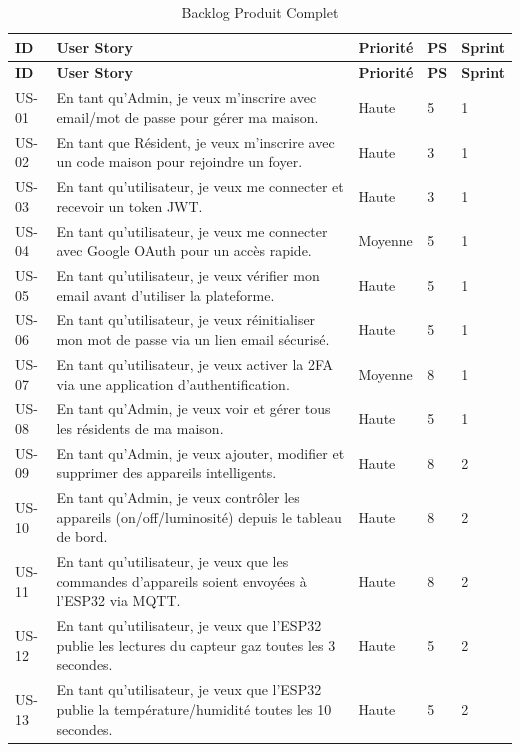 \begin{center}
\begin{longtable}{p{} p{} p{} p{} p{}}
\caption{Backlog Produit Complet}\label{tab:backlog}\\
\toprule
\textbf{ID} & \textbf{User Story} & \textbf{Priorité} & \textbf{PS} & \textbf{Sprint} \\
\midrule
\endfirsthead
\toprule
\textbf{ID} & \textbf{User Story} & \textbf{Priorité} & \textbf{PS} & \textbf{Sprint} \\
\midrule
\endhead
\bottomrule
\endfoot
US-01 & En tant qu'Admin, je veux m'inscrire avec email/mot de passe pour gérer ma maison. & Haute & 5 & 1 \\
US-02 & En tant que Résident, je veux m'inscrire avec un code maison pour rejoindre un foyer. & Haute & 3 & 1 \\
US-03 & En tant qu'utilisateur, je veux me connecter et recevoir un token JWT. & Haute & 3 & 1 \\
US-04 & En tant qu'utilisateur, je veux me connecter avec Google OAuth pour un accès rapide. & Moyenne & 5 & 1 \\
US-05 & En tant qu'utilisateur, je veux vérifier mon email avant d'utiliser la plateforme. & Haute & 5 & 1 \\
US-06 & En tant qu'utilisateur, je veux réinitialiser mon mot de passe via un lien email sécurisé. & Haute & 5 & 1 \\
US-07 & En tant qu'utilisateur, je veux activer la 2FA via une application d'authentification. & Moyenne & 8 & 1 \\
US-08 & En tant qu'Admin, je veux voir et gérer tous les résidents de ma maison. & Haute & 5 & 1 \\
US-09 & En tant qu'Admin, je veux ajouter, modifier et supprimer des appareils intelligents. & Haute & 8 & 2 \\
US-10 & En tant qu'Admin, je veux contrôler les appareils (on/off/luminosité) depuis le tableau de bord. & Haute & 8 & 2 \\
US-11 & En tant qu'utilisateur, je veux que les commandes d'appareils soient envoyées à l'ESP32 via MQTT. & Haute & 8 & 2 \\
US-12 & En tant qu'utilisateur, je veux que l'ESP32 publie les lectures du capteur gaz toutes les 3 secondes. & Haute & 5 & 2 \\
US-13 & En tant qu'utilisateur, je veux que l'ESP32 publie la température/humidité toutes les 10 secondes. & Haute & 5 & 2 \\

\end{longtable}
\end{center}
